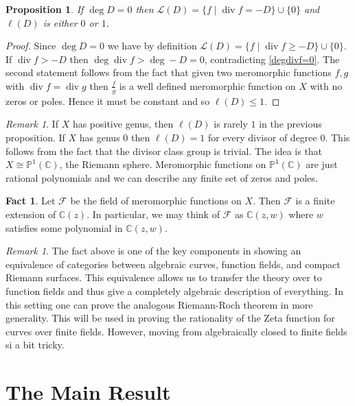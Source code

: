 \documentclass[11pt]{article}
\newcommand{\BB}[1]{\mathbb{#1}} %
\newcommand{\script}[1]{\mathcal{#1}} %
\newcommand{\CC}{\BB{C}}
\newcommand{\PP}{\BB{P}}
\newcommand{\sF}{\script{F}}
\newcommand{\sL}{\script{L}}
\newcommand{\st}{\mid}
\renewcommand{\div}{\operatorname{div}} %
\theoremstyle{plain}
\newtheorem{prop}[propositionCounter]{Proposition}
\theoremstyle{definition}
\newtheorem{fact}[factCounter]{Fact}
\theoremstyle{remark}
\newtheorem{rem}[remarkCounter]{Remark}
\begin{document}
\begin{prop}
	If $\deg D = 0$ then $\sL(D) = \{f \st \div f = -D\}\cup\{0\}$ and $\ell(D)$ is either $0$ or $1$.
\end{prop}
\begin{proof}
	Since $\deg D = 0$ we have by definition $\sL(D) = \{f \st \div f \geq -D\}\cup\{0\}$. If $\div f > -D$ then $\deg \div f > \deg - D = 0$, contradicting \autoref{degdivf=0}. The second statement follows from the fact that given two meromorphic functions $f,g$ with $\div f = \div g$ then $\frac{f}{g}$ is a well defined meromorphic function on $X$ with no zeros or poles. Hence it must be constant and so $\ell(D) \leq 1$.
\end{proof}

\begin{rem}\label{rem:functionsonP1}
	If $X$ has positive genus, then $\ell(D)$ is rarely $1$ in the previous proposition. If $X$ has genus $0$ then $\ell(D) = 1$ for every divisor of degree $0$. This follows from the fact that the divisor class group is trivial. The idea is that $X \cong \PP^1(\CC)$, the Riemann sphere. Meromorphic functions on $\PP^1(\CC)$ are just rational polynomials and we can describe any finite set of zeros and poles.
\end{rem}

\begin{fact}
	Let $\sF$ be the field of meromorphic functions on $X$. Then $\sF$ is a finite extension of $\CC(z)$. In particular, we may think of $\sF$ as $\CC(z,w)$ where $w$ satisfies some polynomial in $\CC(z,w)$.
\end{fact}

\begin{rem}
	The fact above is one of the key components in showing an equivalence of categories between algebraic curves, function fields, and compact Riemann surfaces. This equivalence allows us to transfer the theory over to function fields and thus give a completely algebraic description of everything. In this setting one can prove the analogous Riemann-Roch theorem in more generality. This will be used in proving the rationality of the Zeta function for curves over finite fields. However, moving from algebraically closed to finite fields si a bit tricky.
\end{rem}

\section{The Main Result}
\end{document}
